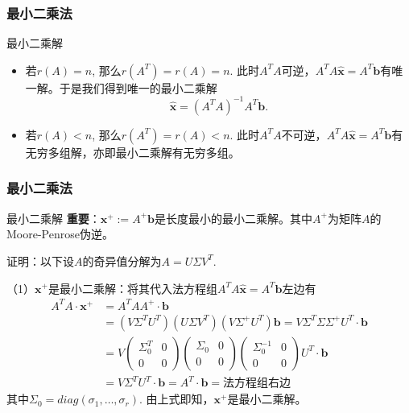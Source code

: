 
\begin{frame}
\frametitle{最小二乘法}

\begin{block}{最小二乘解}
\begin{itemize}
\item<1-> 若$r(A) = n$, 那么$r(A^T) = r(A) = n$. 此时$A^TA$可逆，$A^TA\widehat{\mathbf{x}} = A^T\mathbf{b}$有唯一解。于是我们得到唯一的最小二乘解
$$\widehat{\mathbf{x}} = (A^TA)^{-1}A^T\mathbf{b}.$$
\item<2-> 若$r(A) < n$, 那么$r(A^T) = r(A) < n$. 此时$A^TA$不可逆，$A^TA\widehat{\mathbf{x}} = A^T\mathbf{b}$有无穷多组解，亦即最小二乘解有无穷多组。
\end{itemize}
\end{block}

\end{frame}


\begin{frame}
\frametitle{最小二乘法}

\begin{block}{最小二乘解}
{\bfseries 重要}：$\mathbf{x}^+ := A^+\mathbf{b}$是长度最小的最小二乘解。其中$A^+$为矩阵$A$的Moore-Penrose伪逆。

\vspace{1em}
\pause

证明：以下设$A$的奇异值分解为$A = U\Sigma V^T$.

（1）$\mathbf{x}^+$是最小二乘解：将其代入法方程组$A^TA\widehat{\mathbf{x}} = A^T\mathbf{b}$左边有
\begin{align*}
A^TA\cdot\mathbf{x}^+ & = A^TAA^+ \cdot \mathbf{b} \\
& = (V\Sigma^TU^T)(U\Sigma V^T)(V\Sigma^+ U^T) \mathbf{b} = V\Sigma^T\Sigma\Sigma^+ U^T \cdot \mathbf{b} \\
& = V \begin{pmatrix} \Sigma_0^T & 0 \\ 0 & 0 \end{pmatrix} \begin{pmatrix} \Sigma_0 & 0 \\ 0 & 0 \end{pmatrix} \begin{pmatrix} \Sigma_0^{-1} & 0 \\ 0 & 0 \end{pmatrix} U^T \cdot \mathbf{b} \\
& = V \Sigma^T U^T \cdot \mathbf{b} = A^T \cdot \mathbf{b} = \text{法方程组右边}
\end{align*}
其中$\Sigma_0 = diag(\sigma_1, \ldots, \sigma_r)$. 由上式即知，$\mathbf{x}^+$是最小二乘解。
\end{block}

\end{frame}

